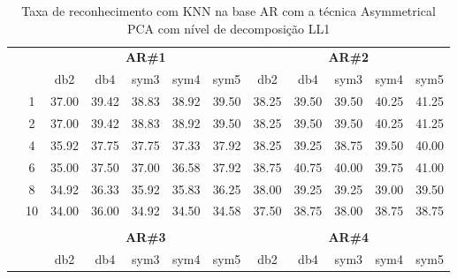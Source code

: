 \begin{table}[H]
	\centering
    \normalsize
	\caption{Taxa de reconhecimento com KNN na base AR com a técnica Asymmetrical PCA com nível de decomposição LL1}
	\begin{tabular}{|c|c|c c c c c|c c c c c|}
\cline{3-12}
\multicolumn{2}{c|}{\multirow{2}{*}{}} & \multicolumn{5}{c|}{\textbf{AR\#1}}  & \multicolumn{5}{c|}{\textbf{AR\#2}} \\\cline{3-12}

\multicolumn{2}{c|}{}  & db2 & db4 & sym3 & sym4 & sym5 & db2 & db4& sym3 & sym4 & sym5 \\\hline

\multicolumn{1}{|c|}{ \multirow{5}{*}{\rotatebox[origin=c]{90}{\textbf{K-vizinhos}}} }
&1	&37.00&	39.42&	38.83&	38.92&	39.50&	38.25&	39.50&	39.50&	40.25&	41.25	\\\cline{2-12}
&2	&37.00&	39.42&	38.83&	38.92&	39.50&	38.25&	39.50&	39.50&	40.25&	41.25	\\\cline{2-12}
&4	&35.92&	37.75&	37.75&	37.33&	37.92&	38.25&	39.25&	38.75&	39.50&	40.00	\\\cline{2-12}
&6	&35.00&	37.50&	37.00&	36.58&	37.92&	38.75&	40.75&	40.00&	39.75&	41.00	\\\cline{2-12}
&8	&34.92&	36.33&	35.92&	35.83&	36.25&	38.00&	39.25&	39.25&	39.00&	39.50	\\\cline{2-12}
&10	&34.00&	36.00&	34.92&	34.50&	34.58&	37.50&	38.75&	38.00&	38.75&	38.75	


\\ \midrule
\multicolumn{12}{c}{}\\ 




\cline{3-12}
\multicolumn{2}{c}{} & \multicolumn{5}{|c|}{\textbf{AR\#3}}  & \multicolumn{5}{c|}{\textbf{AR\#4}} \\\cline{3-12}
\multicolumn{2}{c}{}  & \multicolumn{1}{|c}{db2} & db4 & sym3 & sym4 & sym5 & db2 & db4& sym3 & sym4 & sym5 \\\hline


\end{tabular}
\end{table}
